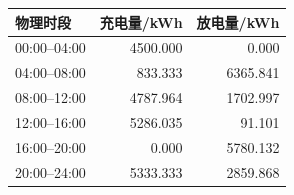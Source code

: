 \begin{tabular}{lrr}
\toprule
物理时段 & 充电量/kWh & 放电量/kWh \\
\midrule
00:00--04:00 & 4500.000 & 0.000 \\
04:00--08:00 & 833.333 & 6365.841 \\
08:00--12:00 & 4787.964 & 1702.997 \\
12:00--16:00 & 5286.035 & 91.101 \\
16:00--20:00 & 0.000 & 5780.132 \\
20:00--24:00 & 5333.333 & 2859.868 \\
\bottomrule
\end{tabular}
